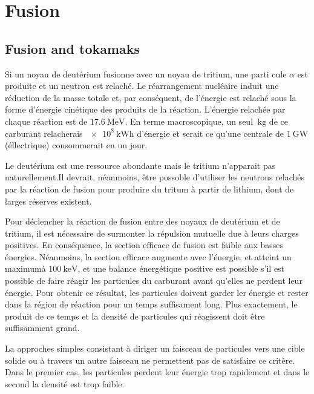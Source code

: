 \documentclass[main.tex]{subfiles}
\begin{document}
\chapter{Fusion}

\section{Fusion and tokamaks}
\label{sec:fusion_et_tokamaks}

Si un noyau de deutérium fusionne avec un noyau de tritium, une parti cule \( \alpha \) est produite et un neutron est relaché.
Le réarrangement nucléaire  induit une réduction de la masse totale et, par conséquent, de l'énergie est relaché sous la forme d'énergie cinétique des produits de la réaction.
L'énergie relachée par chaque réaction est de \( \SI{17.6}{\mega\electronvolt} \).
En terme macroscopique, un seul \( \SI{}{\kilogram} \) de ce carburant relacherais \( \SI{e8}{\kWh} \) d'énergie et serait ce qu'une centrale de \( \SI{1}{\GW} \) (éllectrique) consommerait en un jour.

Le deutérium est une ressource abondante mais le tritium n'apparait pas naturellement.Il devrait, néanmoins, être possoble d'utiliser les neutrons relachés par la réaction de fusion pour produire du tritum à partir de lithium, dont de larges réserves existent.

Pour déclencher la réaction de fusion entre des noyaux de deutérium et de tritium, il est nécessaire de surmonter la répulsion mutuelle due à leurs charges positives. En conséquence, la section efficace de fusion est faible aux basses énergies.
Néanmoins, la section efficace augmente avec l'énergie, et atteint un maximumà \( \SI{100}{\kilo\electronvolt} \), et une balance énergétique positive est possible s'il est possible de faire réagir les particules du carburant avant qu'elles ne perdent leur énergie.
Pour obtenir ce résultat, les particules doivent garder ler énergie et rester dans la région de réaction pour un temps suffisament long.
Plus exactement, le produit de ce temps et la densité de particules qui réagissent doit être suffisamment grand.

La approches simples consistant à diriger un faisceau de particules vers une cible solide ou à travers un autre faisceau ne permettent pas de satisfaire ce critère.
Dans le premier cas, les particules perdent leur énergie trop rapidement et dans le second la densité est trop faible.
\end{document}
